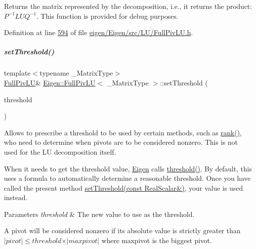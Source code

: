 \begin{DoxyReturn}{Returns}
the matrix represented by the decomposition, i.\+e., it returns the product\+: $ P^{-1} L U Q^{-1} $. This function is provided for debug purposes. 
\end{DoxyReturn}


Definition at line \hyperlink{eigen_2_eigen_2src_2_l_u_2_full_piv_l_u_8h_source_l00594}{594} of file \hyperlink{eigen_2_eigen_2src_2_l_u_2_full_piv_l_u_8h_source}{eigen/\+Eigen/src/\+L\+U/\+Full\+Piv\+L\+U.\+h}.

\mbox{\label{group___l_u___module_a414592d82de98f5bd075965caf56d681}} 
\subparagraph{\texorpdfstring{set\+Threshold()}{setThreshold()}\hspace{0.1cm}{\footnotesize\ttfamily [1/4]}}
{\footnotesize\ttfamily template$<$typename \+\_\+\+Matrix\+Type$>$ \\
\hyperlink{group___l_u___module_class_eigen_1_1_full_piv_l_u}{Full\+Piv\+LU}\& \hyperlink{group___l_u___module_class_eigen_1_1_full_piv_l_u}{Eigen\+::\+Full\+Piv\+LU}$<$ \+\_\+\+Matrix\+Type $>$\+::set\+Threshold (\begin{DoxyParamCaption}\item[{const Real\+Scalar \&}]{threshold }\end{DoxyParamCaption})\hspace{0.3cm}{\ttfamily [inline]}}

Allows to prescribe a threshold to be used by certain methods, such as \hyperlink{group___l_u___module_a67a870aa69e699e058d04802ba0bdad9}{rank()}, who need to determine when pivots are to be considered nonzero. This is not used for the LU decomposition itself.

When it needs to get the threshold value, \hyperlink{namespace_eigen}{Eigen} calls \hyperlink{group___l_u___module_ad77539203694f2d85ff7d11616e5a0a5}{threshold()}. By default, this uses a formula to automatically determine a reasonable threshold. Once you have called the present method \hyperlink{group___l_u___module_a414592d82de98f5bd075965caf56d681}{set\+Threshold(const Real\+Scalar\&)}, your value is used instead.


\begin{DoxyParams}{Parameters}
{\em threshold} & The new value to use as the threshold.\\
\hline
\end{DoxyParams}
A pivot will be considered nonzero if its absolute value is strictly greater than $ \vert pivot \vert \leqslant threshold \times \vert maxpivot \vert $ where maxpivot is the biggest pivot.

